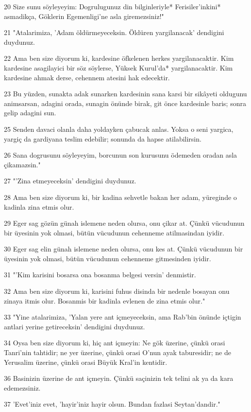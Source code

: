 \par 20 Size sunu söyleyeyim: Dogrulugunuz din bilginleriyle* Ferisiler'inkini* asmadikça, Göklerin Egemenligi'ne asla giremezsiniz!"
\par 21 "Atalarimiza, 'Adam öldürmeyeceksin. Öldüren yargilanacak' dendigini duydunuz.
\par 22 Ama ben size diyorum ki, kardesine öfkelenen herkes yargilanacaktir. Kim kardesine asagilayici bir söz söylerse, Yüksek Kurul'da* yargilanacaktir. Kim kardesine ahmak derse, cehennem atesini hak edecektir.
\par 23 Bu yüzden, sunakta adak sunarken kardesinin sana karsi bir sikâyeti oldugunu animsarsan, adagini orada, sunagin önünde birak, git önce kardesinle baris; sonra gelip adagini sun.
\par 25 Senden davaci olanla daha yoldayken çabucak anlas. Yoksa o seni yargica, yargiç da gardiyana teslim edebilir; sonunda da hapse atilabilirsin.
\par 26 Sana dogrusunu söyleyeyim, borcunun son kurusunu ödemeden oradan asla çikamazsin."
\par 27 "'Zina etmeyeceksin' dendigini duydunuz.
\par 28 Ama ben size diyorum ki, bir kadina sehvetle bakan her adam, yüreginde o kadinla zina etmis olur.
\par 29 Eger sag gözün günah islemene neden olursa, onu çikar at. Çünkü vücudunun bir üyesinin yok olmasi, bütün vücudunun cehenneme atilmasindan iyidir.
\par 30 Eger sag elin günah islemene neden olursa, onu kes at. Çünkü vücudunun bir üyesinin yok olmasi, bütün vücudunun cehenneme gitmesinden iyidir.
\par 31 "'Kim karisini bosarsa ona bosanma belgesi versin' denmistir.
\par 32 Ama ben size diyorum ki, karisini fuhus disinda bir nedenle bosayan onu zinaya itmis olur. Bosanmis bir kadinla evlenen de zina etmis olur."
\par 33 "Yine atalarimiza, 'Yalan yere ant içmeyeceksin, ama Rab'bin önünde içtigin antlari yerine getireceksin' dendigini duydunuz.
\par 34 Oysa ben size diyorum ki, hiç ant içmeyin: Ne gök üzerine, çünkü orasi Tanri'nin tahtidir; ne yer üzerine, çünkü orasi O'nun ayak taburesidir; ne de Yerusalim üzerine, çünkü orasi Büyük Kral'in kentidir.
\par 36 Basinizin üzerine de ant içmeyin. Çünkü saçinizin tek telini ak ya da kara edemezsiniz.
\par 37 'Evet'iniz evet, 'hayir'iniz hayir olsun. Bundan fazlasi Seytan'dandir."
